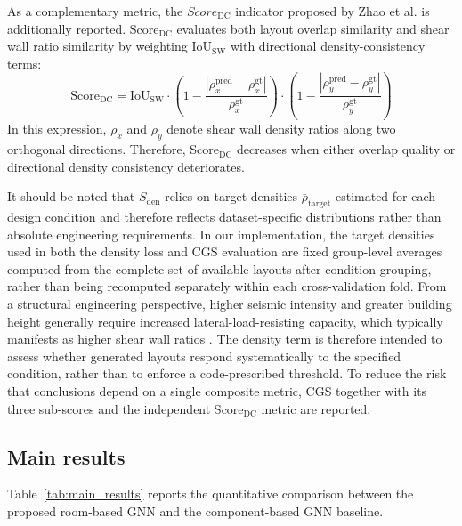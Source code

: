 As a complementary metric, the $Score_{\text{DC}}$ indicator proposed by Zhao et al. \cite{zhaoDesignconditioninformedShearWall2023d} is additionally reported. Score$_{\text{DC}}$ evaluates both layout overlap similarity and shear wall ratio similarity by weighting IoU$_{\text{SW}}$ with directional density-consistency terms:
\begin{equation}
\text{Score}_{\text{DC}} = \text{IoU}_{\text{SW}} \cdot \left(1-\frac{|\rho_x^{\text{pred}}-\rho_x^{\text{gt}}|}{\rho_x^{\text{gt}}}\right) \cdot \left(1-\frac{|\rho_y^{\text{pred}}-\rho_y^{\text{gt}}|}{\rho_y^{\text{gt}}}\right)
\end{equation}
In this expression, $\rho_x$ and $\rho_y$ denote shear wall density ratios along two orthogonal directions. Therefore, Score$_{\text{DC}}$ decreases when either overlap quality or directional density consistency deteriorates.

It should be noted that $S_{\text{den}}$ relies on target densities $\bar\rho_{\text{target}}$ estimated for each design condition and therefore reflects dataset-specific distributions rather than absolute engineering requirements. In our implementation, the target densities used in both the density loss and CGS evaluation are fixed group-level averages computed from the complete set of available layouts after condition grouping, rather than being recomputed separately within each cross-validation fold. From a structural engineering perspective, higher seismic intensity and greater building height generally require increased lateral-load-resisting capacity, which typically manifests as higher shear wall ratios \cite{qianDesignTallBuilding2018}. The density term is therefore intended to assess whether generated layouts respond systematically to the specified condition, rather than to enforce a code-prescribed threshold. To reduce the risk that conclusions depend on a single composite metric, CGS together with its three sub-scores and the independent Score$_{\text{DC}}$ metric are reported.



\subsection{Main results}
\label{subsec:main_results}

Table~\ref{tab:main_results} reports the quantitative comparison between the proposed room-based GNN and the component-based GNN baseline.



